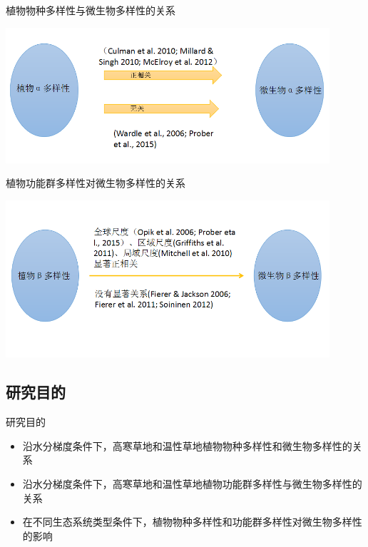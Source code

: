 \begin{frame}{\insertsubsection}
	植物物种多样性与微生物多样性的关系
	\begin{center}
		\includegraphics[width = 0.9\textwidth]{./pic/1.2.4.png}
	\end{center}
\end{frame}

\begin{frame}{\insertsubsection}
	植物功能群多样性对微生物多样性的关系
		\begin{center}
			\includegraphics[width = 0.9\textwidth]{./pic/1.2.5.png}
		\end{center}
\end{frame}


\subsection{研究目的}
\begin{frame}{\insertsubsection}
	研究目的
	\begin{itemize}
		\item 沿水分梯度条件下，高寒草地和温性草地植物物种多样性和微生物多样性的关系
		\item 沿水分梯度条件下，高寒草地和温性草地植物功能群多样性与微生物多样性的关系
		\item 在不同生态系统类型条件下，植物物种多样性和功能群多样性对微生物多样性的影响
	\end{itemize}
\end{frame}